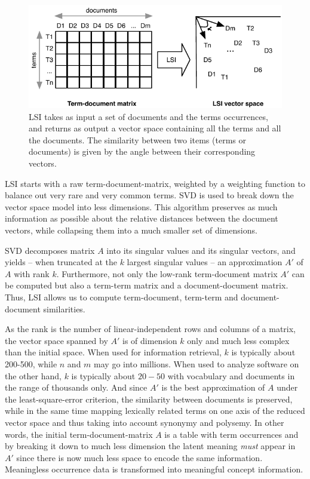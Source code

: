 \begin{figure}[htb]
\begin{center}
\includegraphics[width=.8\columnwidth]{fig/hapax-lsi}
\caption{LSI takes as input a set of documents and the terms occurrences, and returns as output a vector space containing all the terms and all the documents. The similarity between two items (\ie terms or documents) is given by the angle between their corresponding vectors.}
\label{fig:lsi}
\end{center}
\end{figure}

LSI starts with a raw term-document-matrix, weighted by a weighting function to balance out very rare and very common terms. SVD is used to break down the vector space model into less dimensions. This algorithm preserves as much information as possible about the relative distances between the document vectors, while collapsing them into a much smaller set of dimensions.

SVD decomposes matrix $A$ into its singular values and its singular vectors, and yields -- when truncated at the $k$ largest singular values -- an approximation $A'$ of $A$ with rank $k$. Furthermore, not only the low-rank term-document matrix $A'$ can be computed but also a term-term matrix and a document-document matrix. Thus, LSI allows us to compute term-document, term-term and document-document similarities.

As the rank is the number of linear-independent rows and columns of a matrix, the vector space spanned by $A'$ is of dimension $k$ only and much less complex than the initial space. When used for information retrieval, $k$ is typically about 200-500, while $n$ and $m$ may go into millions. When used to analyze software on the other hand, $k$ is typically about $20-50$ with vocabulary and documents in the range of thousands only. And since $A'$ is the best approximation of $A$ under the least-square-error criterion, the similarity between documents is preserved, while in the same time mapping lexically related terms on one axis of the reduced vector space and thus taking into account synonymy and polysemy. In other words, the initial term-document-matrix $A$ is a table with term occurrences and by breaking it down to much less dimension the latent meaning \emph{must} appear in $A'$ since there is now much less space to encode the same information. Meaningless occurrence data is transformed into meaningful concept information.

